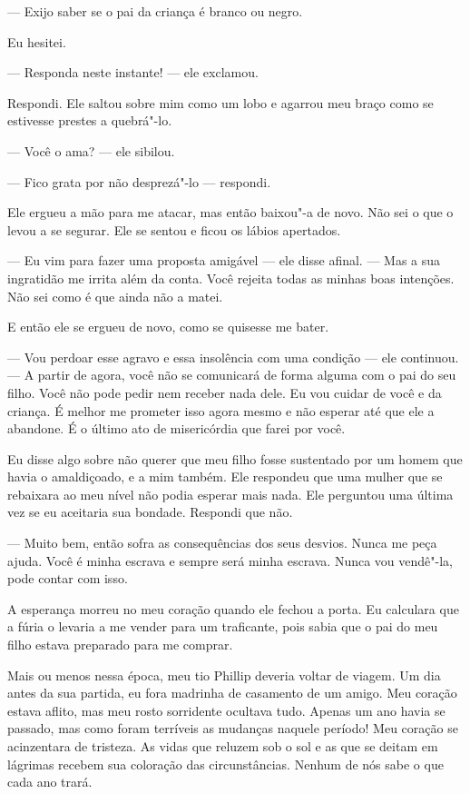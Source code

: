 --- Exijo saber se o pai da criança é branco ou negro.

Eu hesitei.

--- Responda neste instante! --- ele exclamou.

Respondi. Ele saltou sobre mim como um lobo e agarrou meu braço como se
estivesse prestes a quebrá"-lo.

--- Você o ama? --- ele sibilou.

--- Fico grata por não desprezá"-lo ---
respondi.

Ele ergueu a mão para me atacar, mas
então baixou"-a de novo. Não sei o que o levou a se segurar. Ele se
sentou e ficou os lábios apertados.

--- Eu vim para fazer uma proposta amigável --- ele disse afinal. ---
Mas a sua ingratidão me irrita além da conta. Você rejeita todas as
minhas boas intenções. Não sei como é que ainda não a matei.

E então ele se ergueu de novo, como se quisesse me bater.

--- Vou perdoar esse agravo e essa
insolência com uma condição --- ele continuou. --- A partir de agora,
você não se comunicará de forma alguma com o pai do seu filho. Você não
pode pedir nem receber nada dele. Eu vou cuidar de você e da criança. É
melhor me prometer isso agora mesmo e não esperar até que ele a
abandone. É o último ato de misericórdia que farei por você.

Eu disse algo sobre não querer que meu
filho fosse sustentado por um homem que havia o amaldiçoado, e a mim
também. Ele respondeu que uma mulher que se rebaixara ao meu nível não
podia esperar mais nada. Ele perguntou uma última vez se eu aceitaria
sua bondade. Respondi que não.

--- Muito bem, então sofra as
consequências dos seus desvios. Nunca me peça ajuda. Você é minha
escrava e sempre será minha escrava. Nunca vou vendê"-la, pode contar com
isso.

A esperança morreu no meu coração
quando ele fechou a porta. Eu calculara que a fúria o levaria a me
vender para um traficante, pois sabia que o pai do meu filho estava
preparado para me comprar.

Mais ou menos nessa época, meu tio
Phillip deveria voltar de viagem. Um dia antes da sua partida, eu fora
madrinha de casamento de um amigo. Meu coração estava aflito, mas meu
rosto sorridente ocultava tudo. Apenas um ano havia se passado, mas como
foram terríveis as mudanças naquele período! Meu coração se acinzentara
de tristeza. As vidas que reluzem sob o sol e as que se deitam em
lágrimas recebem sua coloração das circunstâncias. Nenhum de nós sabe o
que cada ano trará.

